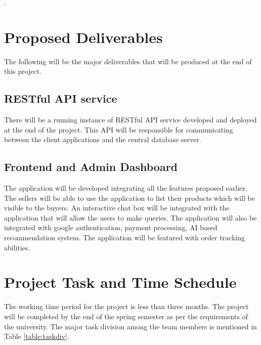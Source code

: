 \documentclass[12pt, a4paper, oneside]{article}
\begin{document}
\pagebreak
. \pagebreak
\section{Proposed Deliverables}
The following will be the major deliverables that will be produced at the end of this project.

\subsection{RESTful API service}
There will be a running instance of RESTful API service developed and deployed at the end of the project. This API will be responsible for communicating between the client applications and the central database server.

\subsection{Frontend and Admin Dashboard}
The application will be developed integrating all the features proposed earlier. The sellers will be able to use the application to list their products which will be visible to the buyers. An interactive chat box will be integrated with the application that will allow the users to make queries. The application will also be integrated with google authentication, payment processing, AI based recommendation system. The application will be featured with order tracking abilities. 



\break
\section{Project Task and Time Schedule}
The working time period for the project is less than three months. The project will be completed by the end of the spring semester as per the requirements of the university. The major task division among the team members is mentioned in Table \ref{table:taskdiv}.
\end{document}
